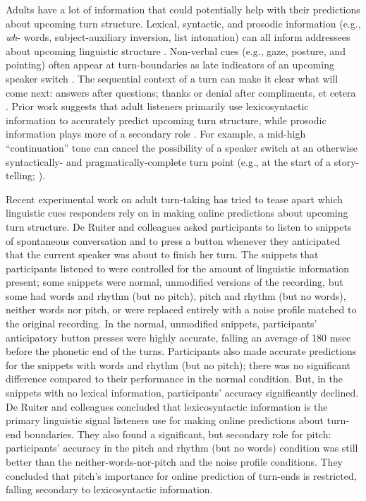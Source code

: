 \documentclass[authoryear, 12pt]{elsarticle}
\begin{document}
Adults have a lot of information that could potentially help with their predictions about upcoming turn structure. Lexical, syntactic, and prosodic information (e.g., \textit{wh}- words, subject-auxiliary inversion, list intonation) can all inform addressees about upcoming linguistic structure \citep{de-ruiter2006, duncan1972, ford1996, torreiraUndRev}. Non-verbal cues (e.g., gaze, posture, and pointing) often appear at turn-boundaries as late indicators of an upcoming speaker switch \citep{rossano2009, stivers2010}. The sequential context of a turn can make it clear what will come next: answers after questions; thanks or denial after compliments, et cetera \citep{schegloff2007}. Prior work suggests that adult listeners primarily use lexicosyntactic information to accurately predict upcoming turn structure, while prosodic information plays more of a secondary role \citep{de-ruiter2006}. For example, a mid-high ``continuation'' tone can cancel the possibility of a speaker switch at an otherwise syntactically- and pragmatically-complete turn point (e.g., at the start of a story-telling; \citealp{ford1996, torreiraUndRev}).

Recent experimental work on adult turn-taking has tried to tease apart which linguistic cues responders rely on in making online predictions about upcoming turn structure. De Ruiter and colleagues \citeyearpar{de-ruiter2006} asked participants to listen to snippets of spontaneous conversation and to press a button whenever they anticipated that the current speaker was about to finish her turn. The snippets that participants listened to were controlled for the amount of linguistic information present; some snippets were normal, unmodified versions of the recording, but some had words and rhythm (but no pitch), pitch and rhythm (but no words), neither words nor pitch, or were replaced entirely with a noise profile matched to the original recording. In the normal, unmodified snippets, participants' anticipatory button presses were highly accurate, falling an average of 180 msec before the phonetic end of the turns. Participants also made accurate predictions for the snippets with words and rhythm (but no pitch); there was no significant difference compared to their performance in the normal condition. But, in the snippets with no lexical information, participants' accuracy significantly declined. De Ruiter and colleagues \citeyearpar{de-ruiter2006} concluded that lexicosyntactic information is the primary linguistic signal listeners use for making online predictions about turn-end boundaries. They also found a significant, but secondary role for pitch: participants' accuracy in the pitch and rhythm (but no words) condition was still better than the neither-words-nor-pitch and the noise profile conditions. They concluded that pitch's importance for online prediction of turn-ends is restricted, falling secondary to lexicosyntactic information.
\end{document}
